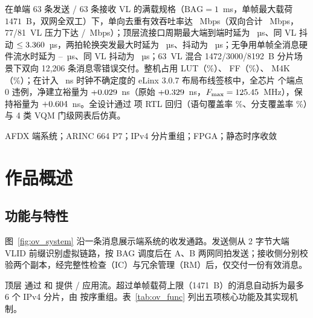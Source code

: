 在单端 63 条发送 / 63 条接收 VL 的满载规格（$\text{BAG}=1$~ms，单帧最大载荷 $1471$~B，双网全双工）下，单向去重有效吞吐率达 \ThruSixtyThree~Mbps（双向合计 \ThruSixtyThreeBi~Mbps，77/81~VL 压力下达 \Thru/\ThruEightyOne~Mbps）；顶层流接口周期最大端到端时延为 \LatSixtyThreePMax~µs、同 VL 抖动 $\le3.360$~µs，两拍轮换突发最大时延为 \LatSixtyThreeBTwo~µs、抖动为 \JitSixtyThreeBTwo~µs；无争用单帧全消息硬件流水时延为 \LatAvg--\Lat~µs、同 VL 抖动为 \JitSameVl~µs；63~VL 混合 1472/3000/8192~B 分片场景下双向 12,206 条消息零错误交付。整机占用 \Lut{} LUT（\LutPct\%）、\FF{} FF（\FFPct\%）、\Mem{} M4K（\MemPct\%）；在计入 \ClkUncert~ns 时钟不确定度的 eLinx 3.0.7 布局布线签核中，全芯片 \countsep{\RoutedEndpoints} 个端点 0 违例，净建立裕量为 $+0.029$~ns（原始 $+0.329$~ns，$F_\text{max}=125.45$~MHz），保持裕量为 $+0.604$~ns。全设计通过 \RegCount{} 项 RTL 回归（语句覆盖率 \CovStmt\%、分支覆盖率 \CovBranch\%）与 4 类 VQM 门级网表后仿真。

\vspace{4pt}
AFDX 端系统；ARINC 664 P7；IPv4 分片重组；FPGA；静态时序收敛

\section{作品概述}

\subsection{功能与特性}

图~\ref{fig:ov_system} 沿一条消息展示端系统的收发通路。发送侧从 2 字节大端 VLID 前缀识别虚拟链路，按 BAG 调度后在 A、B 两网同拍发送；接收侧分别校验两个副本，经完整性检查（IC）与冗余管理（RM）后，仅交付一份有效消息。


顶层  通过  和  提供 / 应用流。超过单帧载荷上限（1471~B）的消息自动拆为最多 6 个 IPv4 分片，由  按序重组。表~\ref{tab:ov_func} 列出五项核心功能及其实现机制。

